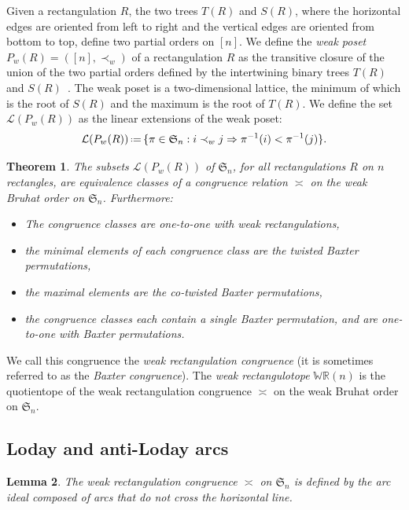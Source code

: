 \documentclass{amsart}
\newtheorem{theorem}{Theorem}%
\newtheorem{lemma}[theorem]{Lemma}
\theoremstyle{definition}
\newcommand{\f}[1]{\mathfrak{#1}} %
\newcommand{\eqdef}{\mbox{\,\raisebox{0.2ex}{\scriptsize\ensuremath{\mathrm:}}\ensuremath{=}\,}} %
\renewcommand{\implies}{\Rightarrow} %
\newcommand{\darkblue}{\color{darkblue}} %
\newcommand{\defn}[1]{\textsl{\darkblue #1}} %
\newcommand{\polytope}[1]{\mathds{#1}} %
\newcommand{\WRP}{\polytope{WR}} %
\newcommand{
\weakeq}{\asymp}
\begin{document}
Given a rectangulation $R$, the two trees $T(R)$ and $S(R)$, where the horizontal edges are oriented from left to right and the vertical edges are oriented from bottom to top,
define two partial orders on $[n]$.
We define the \defn{weak poset} $P_w(R)=([n],\prec_w)$ of a rectangulation $R$ as the transitive closure of the union of the two partial orders defined by the intertwining binary trees $T(R)$ and $S(R)$~\cite{MR4014603}.
The weak poset is a two-dimensional lattice, the minimum of which is the root of $S(R)$ and the maximum is the root of $T(R)$.
We define the set $\mathcal{L}(P_w(R))$ as the linear extensions of the weak poset:
\[
\mathcal{L}(P_w(R)) \eqdef \{\pi\in\f{S}_n : i\prec_w j\implies \pi^{-1}(i) < \pi^{-1}(j)\}.
\]

\begin{theorem}
  The subsets $\mathcal{L}(P_w(R))$ of $\f{S}_n$, for all rectangulations $R$ on $n$ rectangles, 
  are equivalence classes of a congruence relation $
\weakeq$ on the weak Bruhat order on $\f{S}_n$.
  Furthermore:
  \begin{itemize}
  \item The congruence classes are one-to-one with weak rectangulations,  
  \item the minimal elements of each congruence class are the twisted Baxter permutations,
  \item the maximal elements are the co-twisted Baxter permutations,
  \item the congruence classes each contain a single Baxter permutation, and are one-to-one with Baxter permutations.
  \end{itemize}
\end{theorem}

We call this congruence the \defn{weak rectangulation congruence} (it is sometimes referred to as the \defn{Baxter congruence}).
The \defn{weak rectangulotope} $\WRP(n)$ is the quotientope of the weak rectangulation congruence $
\weakeq$ on the weak Bruhat order on $\f{S}_n$.

\subsection{Loday and anti-Loday arcs}

\begin{lemma}
The weak rectangulation congruence $
\weakeq$ on $\f{S}_n$ is defined by the arc ideal composed of arcs that do not cross the horizontal line.
\end{lemma}
\end{document}

